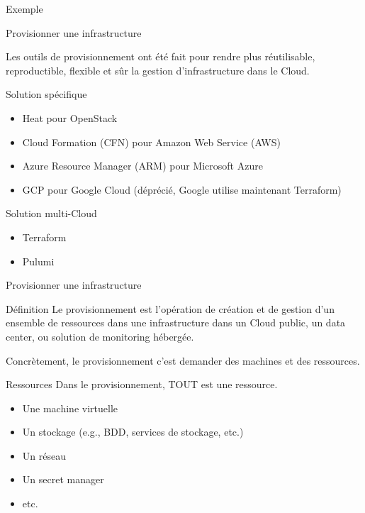 \documentclass[aspectratio=169,10pt]{beamer}
\begin{document}

\begin{frame}{Exemple}

\begin{center}
    
\end{center}
\end{frame}

\begin{frame}{Provisionner une infrastructure}

Les outils de provisionnement ont été fait pour rendre plus réutilisable, reproductible, flexible et sûr la gestion d'infrastructure dans le Cloud.

\begin{alertblock}{Solution spécifique}
\begin{itemize}
    \item Heat pour OpenStack
    \item Cloud Formation (CFN) pour Amazon Web Service (AWS)
    \item Azure Resource Manager (ARM) pour Microsoft Azure 
    \item GCP pour Google Cloud (déprécié, Google utilise maintenant Terraform)
\end{itemize}
\end{alertblock}

\begin{alertblock}{Solution multi-Cloud}
\begin{itemize}
    \item Terraform
    \item Pulumi
\end{itemize}
\end{alertblock}

\end{frame}

\begin{frame}{Provisionner une infrastructure}

\begin{alertblock}{Définition}
Le provisionnement est l'opération de création et de gestion d'un ensemble de ressources dans une infrastructure dans un Cloud public, un data center, ou solution de monitoring hébergée.
\end{alertblock}

Concrètement, le provisionnement c'est demander des machines et des ressources.

\pause

\begin{alertblock}{Ressources}
Dans le provisionnement, TOUT est une ressource. 
\begin{itemize}
    \item Une machine virtuelle
    \item Un stockage (e.g., BDD, services de stockage, etc.)
    \item Un réseau
    \item Un secret manager
    \item etc.
\end{itemize}
\end{alertblock}

\end{frame}
\end{document}
